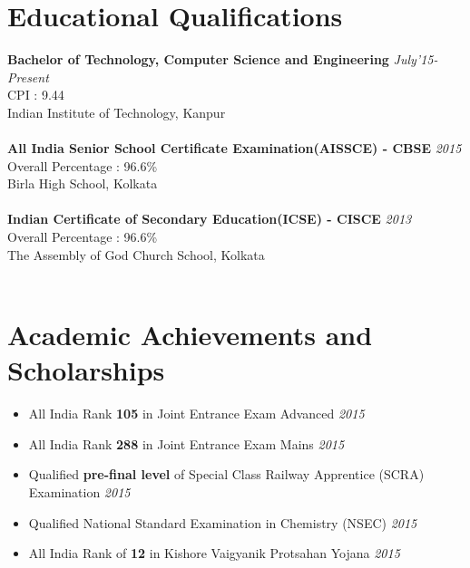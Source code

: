 \documentclass[11pt,a4paper]{moderncv}
\newcommand{\education}[5]{
  \textbf{\large{#1}} \hfill\textit{#2}\\
  #3 : #4\\
  #5\\
  \\
}
\newcommand{\achievement}[2]{
  \item #1 \hfill \textit{#2}\vspace{2mm}
}
\begin{document}
  \maketitle
  \section{Educational Qualifications}
    \education{Bachelor of Technology, Computer Science and Engineering}{July'15-Present}{CPI}{9.44}{Indian Institute of Technology, Kanpur}
    \education{All India Senior School Certificate Examination(AISSCE) - CBSE}{2015}{Overall Percentage}{96.6\%}{Birla High School, Kolkata}
    \education{Indian Certificate of Secondary Education(ICSE) - CISCE}{2013}{Overall Percentage}{96.6\%}{The Assembly of God Church School, Kolkata}
  \section{Academic Achievements and Scholarships}
    \begin{itemize}
      \achievement{All India Rank \textbf{105} in Joint Entrance Exam Advanced}{2015}
      \achievement{All India Rank \textbf{288} in Joint Entrance Exam Mains}{2015}
      \achievement{Qualified \textbf{pre-final level} of Special Class Railway Apprentice (SCRA) Examination}{2015}
      \achievement{Qualified National Standard Examination in Chemistry (NSEC)}{2015}
      \achievement{All India Rank of \textbf{12} in Kishore Vaigyanik Protsahan Yojana}{2015}
    \end{itemize}
\end{document}
